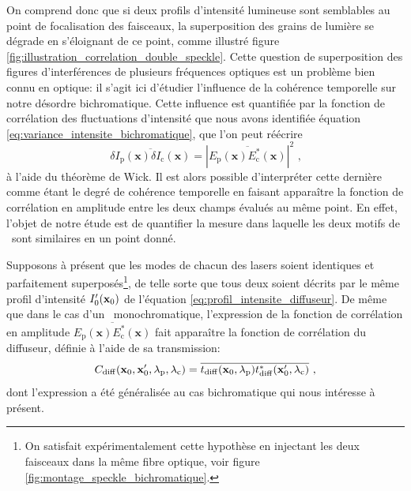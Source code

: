 On comprend donc que si deux profils d'intensité lumineuse sont semblables au point de focalisation des faisceaux, la superposition des grains de lumière se dégrade en s'éloignant de ce point, comme illustré figure \ref{fig:illustration_correlation_double_speckle}. Cette question de superposition des figures d'interférences de plusieurs fréquences optiques est un problème bien connu en optique: il s'agit ici d'étudier l'influence de la cohérence temporelle sur notre désordre bichromatique. Cette influence est quantifiée par la fonction de corrélation des fluctuations d'intensité que nous avons identifiée équation \ref{eq:variance_intensite_bichromatique}, que l'on peut réécrire 
\begin{equation}
\overline{\delta I_{\mathrm{p}}(\mathbf{x}) \delta I_{\mathrm{c}} (\mathbf{x})} = \left| \overline{E_{\mathrm{p}}(\mathbf{x}) E^*_{\mathrm{c}}(\mathbf{x})} \right|^2 \text{ ,}
\end{equation}
à l'aide du théorème de Wick. Il est alors possible d'interpréter cette dernière comme étant le degré de cohérence temporelle en faisant apparaître la fonction de corrélation en amplitude entre les deux champs évalués au même point. En effet, l'objet de notre étude est de quantifier la mesure dans laquelle les deux motifs de \speckle\ sont similaires en un point donné.


Supposons à présent que les modes de chacun des lasers soient identiques et parfaitement superposés\footnote{On satisfait expérimentalement cette hypothèse en injectant les deux faisceaux dans la même fibre optique, voir figure \ref{fig:montage_speckle_bichromatique}.}, de telle sorte que tous deux soient décrits par le même profil d'intensité $I'_0(\mathbf{x}_0)$ de l'équation \ref{eq:profil_intensite_diffuseur}. De même que dans le cas d'un \speckle\ monochromatique, l'expression de la fonction de corrélation en amplitude $\overline{E_{\mathrm{p}}(\mathbf{x}) E^*_{\mathrm{c}}(\mathbf{x})}$ fait apparaître la fonction de corrélation du diffuseur, définie à l'aide de sa transmission:
\begin{equation}
C_{\mathrm{diff}}(\mathbf{x}_0,\mathbf{x}_0',\lambda_{\mathrm{p}},\lambda_{\mathrm{c}})=\overline{t_{\mathrm{diff}}(\mathbf{x}_0,\lambda_{\mathrm{p}})t_{\mathrm{diff}}^*(\mathbf{x}_0',\lambda_{\mathrm{c}})} \text{ ,}
\end{equation}
dont l'expression a été généralisée au cas bichromatique qui nous intéresse à présent. 

